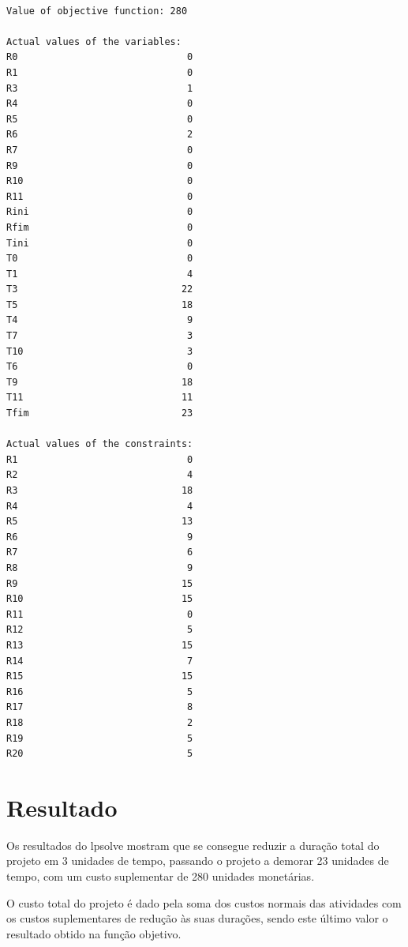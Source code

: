 \begin{verbatim}

Value of objective function: 280

Actual values of the variables:
R0                              0
R1                              0
R3                              1
R4                              0
R5                              0
R6                              2
R7                              0
R9                              0
R10                             0
R11                             0
Rini                            0
Rfim                            0
Tini                            0
T0                              0
T1                              4
T3                             22
T5                             18
T4                              9
T7                              3
T10                             3
T6                              0
T9                             18
T11                            11
Tfim                           23

Actual values of the constraints:
R1                              0
R2                              4
R3                             18
R4                              4
R5                             13
R6                              9
R7                              6
R8                              9
R9                             15
R10                            15
R11                             0
R12                             5
R13                            15
R14                             7
R15                            15
R16                             5
R17                             8
R18                             2
R19                             5
R20                             5

\end{verbatim}

\newpage
\section{Resultado}
\label{p3:resultado}

Os resultados do lpsolve mostram que se consegue reduzir a duração total do projeto em 3 unidades de tempo, passando o projeto a demorar 23 unidades de tempo, com um custo suplementar de 280 unidades monetárias. 

O custo total do projeto é dado pela soma dos custos normais das atividades com os custos suplementares de redução às suas durações, sendo este último valor o resultado obtido na função objetivo.

